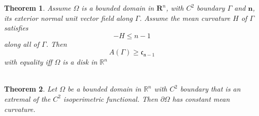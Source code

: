 \documentclass[oneside]{book}
\newtheorem{theorem}{Theorem}[section]
\begin{document}
	
	
	\begin{theorem}
		\label{t:5}
		Assume $\Omega$ is a bounded domain in $\mathbf{R}^{n}$, with $C^{2}$ boundary $\Gamma$
		and $\mathbf{n}$, its exterior normal unit vector field along $\Gamma$. Assume the mean curvature
		$H$ of $\Gamma$ satisfies
		$$
		-H \leq n-1
		$$
		along all of $\Gamma$. Then
		$$
		A(\Gamma) \geq \mathfrak{c}_{\mathfrak{n}-1}
		$$
		with equality iff $\Omega$ is a disk in $\mathbb{R}^{n}$ \\\\
	\end{theorem}
	
	
	
	
	
	\begin{theorem}
		\label{t:5.5}
		Let $\Omega$ be a bounded domain in $\mathbb{R}^{n}$ with $C^{2}$ boundary that is an extremal of the $C^{2}$ isoperimetric functional. Then  $\partial \Omega$ has constant mean curvature.
	\end{theorem}
	
	
	
	
	
	
	
\end{document}
